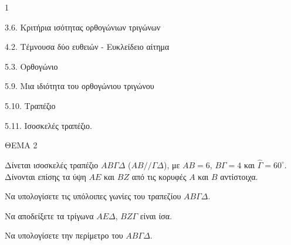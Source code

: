 \begin{ylh}{1}
    \item 3.6. Κριτήρια ισότητας ορθογώνιων τριγώνων
    \item 4.2. Τέμνουσα δύο ευθειών - Ευκλείδειο αίτημα
    \item 5.3. Ορθογώνιο
    \item 5.9. Μια ιδιότητα του ορθογώνιου τριγώνου
    \item 5.10. Τραπέζιο
    \item 5.11. Ισοσκελές τραπέζιο.
\end{ylh}

ΘΕΜΑ 2

Δίνεται ισοσκελές τραπέζιο $AB\Gamma\Delta$ ($AB//\Gamma\Delta$), με $AB=6$, $B\Gamma=4$ και $\widehat{\Gamma} = 60^{\circ}$. Δίνονται επίσης τα ύψη $AE$ και $BZ$ από τις κορυφές $A$ και $B$ αντίστοιχα.

\begin{alist}
\item Να υπολογίσετε τις υπόλοιπες γωνίες του τραπεζίου $AB\Gamma\Delta$. 
\item Να αποδείξετε τα τρίγωνα $AE\Delta$, $BZ\Gamma$ είναι ίσα. 
\item Να υπολογίσετε την περίμετρο του $AB\Gamma\Delta$. 

\begin{center}
\end{center}
\end{alist}
